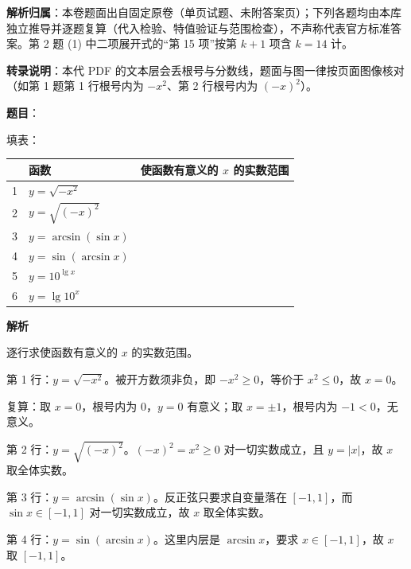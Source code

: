 

\begin{gknotice}
\textbf{解析归属}：本卷题面出自固定原卷（单页试题、未附答案页）；下列各题均由本库独立推导并逐题复算（代入检验、特值验证与范围检查），不声称代表官方标准答案。第 2 题 (1) 中二项展开式的“第 15 项”按第 $k+1$ 项含 $k=14$ 计。

\textbf{转录说明}：本代 PDF 的文本层会丢根号与分数线，题面与图一律按页面图像核对（如第 1 题第 1 行根号内为 $-x^2$、第 2 行根号内为 $(-x)^2$）。
\end{gknotice}

\begin{answer}

\textbf{题目}：

填表：

\begin{center}
\begin{tabular}{lll}
\toprule
 & 函数 & 使函数有意义的 $x$ 的实数范围 \\
\midrule
1 & $y=\sqrt{-x^2}$ &  \\
2 & $y=\sqrt{(-x)^2}$ &  \\
3 & $y=\arcsin(\sin x)$ &  \\
4 & $y=\sin(\arcsin x)$ &  \\
5 & $y=10^{\lg x}$ &  \\
6 & $y=\lg 10^x$ &  \\
\bottomrule
\end{tabular}
\end{center}

\textbf{解析}

逐行求使函数有意义的 $x$ 的实数范围。

第 1 行：$y=\sqrt{-x^2}$。被开方数须非负，即 $-x^2\geqslant0$，等价于 $x^2\leqslant0$，故 $x=0$。

复算：取 $x=0$，根号内为 $0$，$y=0$ 有意义；取 $x=\pm1$，根号内为 $-1<0$，无意义。

第 2 行：$y=\sqrt{(-x)^2}$。$(-x)^2=x^2\geqslant0$ 对一切实数成立，且 $y=\lvert x\rvert$，故 $x$ 取全体实数。

第 3 行：$y=\arcsin(\sin x)$。反正弦只要求自变量落在 $[-1,1]$，而 $\sin x\in[-1,1]$ 对一切实数成立，故 $x$ 取全体实数。

第 4 行：$y=\sin(\arcsin x)$。这里内层是 $\arcsin x$，要求 $x\in[-1,1]$，故 $x$ 取 $[-1,1]$。


\end{answer}
